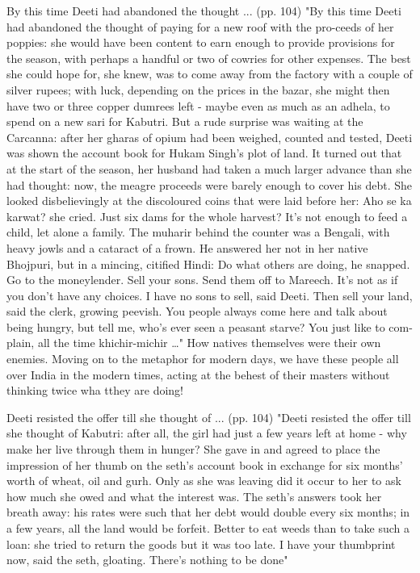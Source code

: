 By this time Deeti had abandoned the thought ... (pp. 104)
"By this time Deeti had abandoned the thought of paying for a new roof with the pro-ceeds of her poppies: she would have been content to earn enough to provide provisions for the season, with perhaps a handful or two of cowries for other expenses. The best she could hope for, she knew, was to come away from the factory with a couple of silver rupees; with luck, depending on the prices in the bazar, she might then have two or three copper dumrees left - maybe even as much as an adhela, to spend on a new sari for Kabutri. But a rude surprise was waiting at the Carcanna: after her gharas of opium had been weighed, counted and tested, Deeti was shown the account book for Hukam Singh’s plot of land. It turned out that at the start of the season, her husband had taken a much larger advance than she had thought: now, the meagre proceeds were barely enough to cover his debt. She looked disbelievingly at the discoloured coins that were laid before her: Aho se ka karwat? she cried. Just six dams for the whole harvest? It’s not enough to feed a child, let alone a family. The muharir behind the counter was a Bengali, with heavy jowls and a cataract of a frown. He answered her not in her native Bhojpuri, but in a mincing, citified Hindi: Do what others are doing, he snapped. Go to the moneylender. Sell your sons. Send them off to Mareech. It’s not as if you don’t have any choices. I have no sons to sell, said Deeti. Then sell your land, said the clerk, growing peevish. You people always come here and talk about being hungry, but tell me, who’s ever seen a peasant starve? You just like to com-plain, all the time khichir-michir …"
How natives themselves were their own enemies. Moving on to the metaphor for modern days, we have these people all over India in the modern times, acting at the behest of their masters without thinking twice wha tthey are doing!

Deeti resisted the offer till she thought of ... (pp. 104)
"Deeti resisted the offer till she thought of Kabutri: after all, the girl had just a few years left at home - why make her live through them in hunger? She gave in and agreed to place the impression of her thumb on the seth’s account book in exchange for six months’ worth of wheat, oil and gurh. Only as she was leaving did it occur to her to ask how much she owed and what the interest was. The seth’s answers took her breath away: his rates were such that her debt would double every six months; in a few years, all the land would be forfeit. Better to eat weeds than to take such a loan: she tried to return the goods but it was too late. I have your thumbprint now, said the seth, gloating. There’s nothing to be done"

